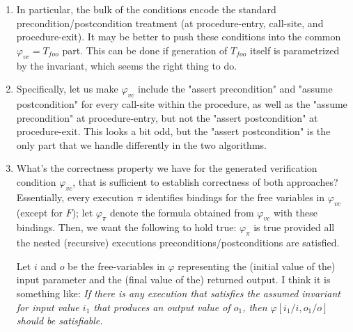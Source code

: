 \begin{enumerate}
\begin{enumerate}
\item In particular, the bulk of the conditions encode the standard
precondition/postcondition treatment (at procedure-entry, call-site,
and procedure-exit). It may be better to push these conditions into
the common $\varphi_{vc} = T_{foo}$ part. This can be done if generation of
$T_{foo}$ itself is parametrized by the invariant, which seems the right thing to do.

\item Specifically, let us make $\varphi_{vc}$ include the "assert precondition"
and "assume postcondition" for every call-site within the procedure, as well
as the "assume precondition" at procedure-entry, but not the "assert
postcondition" at procedure-exit. This looks a bit odd, but the "assert
postcondition" is the only part that we handle differently in the two algorithms.

\item What's the correctness property we have for the generated verification
condition $\varphi_{vc}$, that is sufficient to establish correctness of both approaches?
Essentially, every execution $\pi$ identifies bindings for the free variables in $\varphi_{vc}$ (except for $F$);
let $\varphi_\pi$ denote the formula obtained from $\varphi_{vc}$ with these bindings.
Then, we want the following to hold true: $\varphi_\pi$ is true provided all the
nested (recursive) executions preconditions/postconditions are satisfied.

Let $i$ and $o$ be the free-variables in $\varphi$
representing the (initial value of the) input parameter and the
(final value of the) returned output. I think it is something like:
\emph{
If there is any execution that
satisfies the assumed invariant for input value $i_1$ that produces
an output value of $o_1$, then $\varphi[i_1/i,o_1/o]$ should be
satisfiable.
}


\end{enumerate}

\end{enumerate}